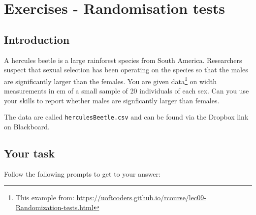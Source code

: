 \documentclass[
  a4paperpaper,
]{book}
\begin{document}
\hypertarget{exercises---randomisation-tests}{%
\section{Exercises - Randomisation tests}\label{exercises---randomisation-tests}}

\hypertarget{introduction-1}{%
\subsection{Introduction}\label{introduction-1}}

A hercules beetle is a large rainforest species from South America. Researchers suspect that sexual selection has been operating on the species so that the males are significantly larger than the females. You are given data\footnote{This example from: \url{https://uoftcoders.github.io/rcourse/lec09-Randomization-tests.html}} on width measurements in cm of a small sample of 20 individuals of each sex. Can you use your skills to report whether males are signficantly larger than females.

The data are called \texttt{herculesBeetle.csv} and can be found via the Dropbox link on Blackboard.

\hypertarget{your-task}{%
\subsection{Your task}\label{your-task}}

Follow the following prompts to get to your answer:
\end{document}

